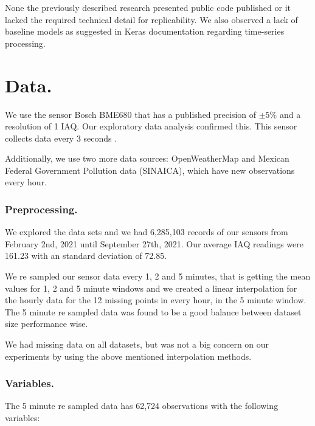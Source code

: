 \documentclass{llncs}
\begin{document}
None the previously described research presented public code published
or it lacked the required technical detail for replicability. We also
observed a lack of baseline models as suggested
in Keras documentation regarding time-series processing.

    \hypertarget{data.}{%
\section{Data.}\label{data.}}

We use the sensor Bosch BME680 \cite{bme680} that has a published precision of
\(\pm5\%\) and a resolution of 1 IAQ. Our exploratory data analysis
confirmed this. This sensor collects data every 3 seconds \cite{mancuso}.


Additionally, we use two more data sources: OpenWeatherMap and
Mexican Federal Government Pollution data (SINAICA), which have new observations every hour.

\hypertarget{preprocessing.}{%
\subsubsection{Preprocessing.}\label{preprocessing.}}

We explored the data sets and we had 6,285,103 records of our sensors
from February 2nd, 2021 until September 27th, 2021. Our average IAQ
readings were 161.23 with an standard deviation of 72.85.

We re sampled our sensor data every 1, 2
and 5 minutes, that is getting the mean values for 1, 2 and 5 minute
windows and we created a linear interpolation for the hourly data for
the 12 missing points in every hour, in the 5 minute window. The 5
minute re sampled data was found to be a good balance between dataset
size performance wise.

We had missing data on all datasets, but was not a big concern on our
experiments by using the above mentioned interpolation methods.

\hypertarget{variables.}{%
\subsubsection{Variables.}\label{variables.}}

The 5 minute re sampled data has 62,724 observations with the following
variables:
\end{document}
